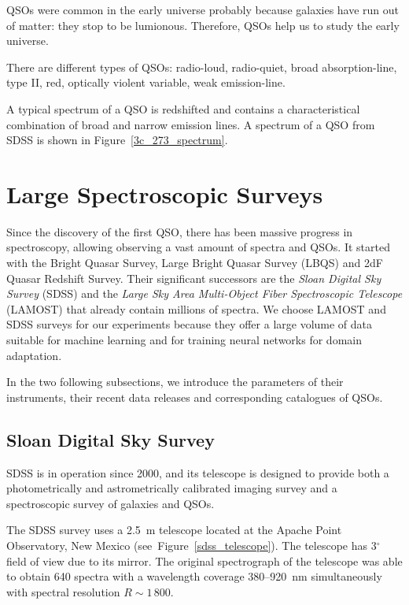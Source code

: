 QSOs were common in the early universe probably because galaxies have run out of matter: they stop to be lumionous.
Therefore, QSOs help us to study the early universe.

There are different types of QSOs: radio-loud, radio-quiet, broad absorption-line, type II, red, optically violent variable, weak emission-line.

A typical spectrum of a QSO is redshifted and
contains a characteristical combination of broad and narrow emission lines.
A spectrum of a QSO from SDSS is shown in Figure~\ref{3c_273_spectrum}.

\section{Large Spectroscopic Surveys}
\label{large_spec_surveys}

Since the discovery of the first QSO,
there has been massive progress in spectroscopy,
allowing observing a vast amount of spectra and QSOs.
It started with the Bright Quasar Survey, Large Bright Quasar Survey (LBQS) and 2dF Quasar Redshift Survey.
Their significant successors are the \textit{Sloan Digital Sky Survey} (SDSS)
and the \textit{Large Sky Area Multi-Object Fiber Spectroscopic Telescope} (LAMOST)
that already contain millions of spectra.
We choose LAMOST and SDSS surveys for our experiments
because they offer a large volume of data suitable for machine learning
and for training neural networks for domain adaptation.

In the two following subsections,
we introduce the parameters of their instruments,
their recent data releases and corresponding catalogues of QSOs.

\subsection{Sloan Digital Sky Survey}
\label{sdss}

SDSS is in operation since 2000,
and its telescope is designed to provide both a photometrically
and astrometrically calibrated imaging survey
and a spectroscopic survey of galaxies and QSOs.~\cite{york2000}

The SDSS survey uses a 2.5~m telescope located at the Apache Point Observatory, New Mexico (see~Figure~\ref{sdss_telescope}).
The telescope has 3\(^{\circ}\) field of view due to its mirror.
The original spectrograph of the telescope was able to obtain 640 spectra
with a wavelength coverage 380--920~nm simultaneously
with spectral resolution \(R \sim 1\,800\).~\cite{york2000, gunn1998}

